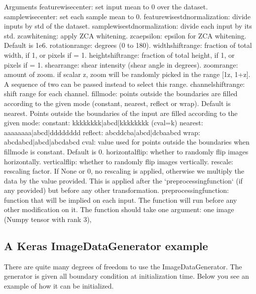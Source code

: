 \documentclass[letterpaper,10pt,english]{sphinxmanual}
\begin{document}
\begin{sphinxVerbatim}[commandchars=\\\{\}]
\PYGZsh{} Arguments
    featurewise\PYGZus{}center: set input mean to 0 over the dataset.
    samplewise\PYGZus{}center: set each sample mean to 0.
    featurewise\PYGZus{}std\PYGZus{}normalization: divide inputs by std of the dataset.
    samplewise\PYGZus{}std\PYGZus{}normalization: divide each input by its std.
    zca\PYGZus{}whitening: apply ZCA whitening.
    zca\PYGZus{}epsilon: epsilon for ZCA whitening. Default is 1e\PYGZhy{}6.
    rotation\PYGZus{}range: degrees (0 to 180).
    width\PYGZus{}shift\PYGZus{}range: fraction of total width, if \PYGZlt{} 1, or pixels if \PYGZgt{}= 1.
    height\PYGZus{}shift\PYGZus{}range: fraction of total height, if \PYGZlt{} 1, or pixels if \PYGZgt{}= 1.
    shear\PYGZus{}range: shear intensity (shear angle in degrees).
    zoom\PYGZus{}range: amount of zoom. if scalar z, zoom will be randomly picked
        in the range [1\PYGZhy{}z, 1+z]. A sequence of two can be passed instead
        to select this range.
    channel\PYGZus{}shift\PYGZus{}range: shift range for each channel.
    fill\PYGZus{}mode: points outside the boundaries are filled according to the
        given mode (\PYGZsq{}constant\PYGZsq{}, \PYGZsq{}nearest\PYGZsq{}, \PYGZsq{}reflect\PYGZsq{} or \PYGZsq{}wrap\PYGZsq{}). Default
        is \PYGZsq{}nearest\PYGZsq{}.
        Points outside the boundaries of the input are filled according to the given mode:
            \PYGZsq{}constant\PYGZsq{}: kkkkkkkk|abcd|kkkkkkkk (cval=k)
            \PYGZsq{}nearest\PYGZsq{}:  aaaaaaaa|abcd|dddddddd
            \PYGZsq{}reflect\PYGZsq{}:  abcddcba|abcd|dcbaabcd
            \PYGZsq{}wrap\PYGZsq{}:  abcdabcd|abcd|abcdabcd
    cval: value used for points outside the boundaries when fill\PYGZus{}mode is
        \PYGZsq{}constant\PYGZsq{}. Default is 0.
    horizontal\PYGZus{}flip: whether to randomly flip images horizontally.
    vertical\PYGZus{}flip: whether to randomly flip images vertically.
    rescale: rescaling factor. If None or 0, no rescaling is applied,
        otherwise we multiply the data by the value provided. This is
        applied after the `preprocessing\PYGZus{}function` (if any provided)
        but before any other transformation.
    preprocessing\PYGZus{}function: function that will be implied on each input.
        The function will run before any other modification on it.
        The function should take one argument:
        one image (Numpy tensor with rank 3),
\end{sphinxVerbatim}


\subsection{A Keras ImageDataGenerator example}
\label{\detokenize{03-Datasets:a-keras-imagedatagenerator-example}}
\sphinxAtStartPar
There are quite many degrees of freedom to use the ImageDataGenerator. The generator is given all boundary condition at initialization time. Below you see an example of how it can be initialized.
\end{document}
